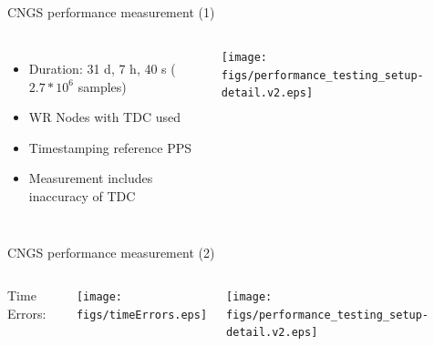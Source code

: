 \documentclass[compress,red]{beamer}
\begin{document}
\subsection{}
\begin{frame}{CNGS performance measurement (1)}

  \begin{columns}[c]
	  \begin{itemize}
		\item Duration: 31 d, 7 h, 40 s ($2.7*10^6$ samples)
		\item WR Nodes with TDC used
		\item Timestamping reference PPS
		\item Measurement includes inaccuracy of TDC
	  \end{itemize}
		\begin{center}
		\texttt{[image: figs/performance\_testing\_setup-detail.v2.eps]}
		\end{center}
  \end{columns}


\end{frame}
\begin{frame}{CNGS performance measurement (2)}

  \begin{columns}[c]
	  \begin{center}
	  Time Errors:
	  \end{center}
	  \begin{center}
	\texttt{[image: figs/timeErrors.eps]}
	  \end{center}
		\begin{center}
		\texttt{[image: figs/performance\_testing\_setup-detail.v2.eps]}
		
		\end{center}
  \end{columns}


\end{frame}
\end{document}
